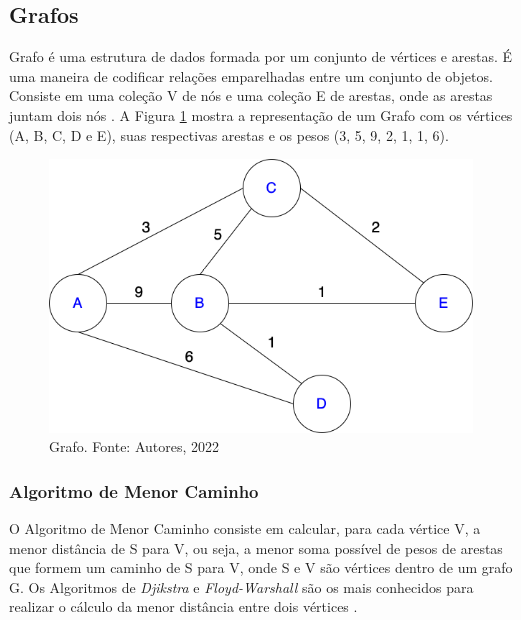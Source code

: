 \subsection{Grafos}

\label{sec:grafos}

Grafo é uma estrutura de dados formada por um conjunto de vértices e arestas. É uma maneira de codificar relações emparelhadas entre um conjunto de objetos. Consiste em uma coleção V de nós e uma coleção E de arestas, onde as arestas juntam dois nós \cite{Kleinberg+Tardos:06a}. A Figura \ref{grafo_1} mostra a representação de um Grafo com os vértices (A, B, C, D e E), suas respectivas arestas e os pesos (3, 5, 9, 2, 1, 1, 6).

\begin{figure}[H]
    \begin{center}
        \includegraphics[scale=0.45]{figuras/referencial_teorico/Grafo.drawio.png}
        \caption{{Grafo. Fonte: Autores, 2022}}
        \label{grafo_1}
    \end{center}
\end{figure}

\subsubsection{Algoritmo de Menor Caminho}

\label{sec:ssp}

O Algoritmo de Menor Caminho consiste em calcular, para cada vértice V, a menor distância de S para V, ou seja, a menor soma possível de pesos de arestas que formem um caminho de S para V, onde S e V são vértices dentro de um grafo G. Os Algoritmos de \textit{Djikstra} e \textit{Floyd-Warshall} são os mais conhecidos para realizar o cálculo da menor distância entre dois vértices \cite{even2011graph}.